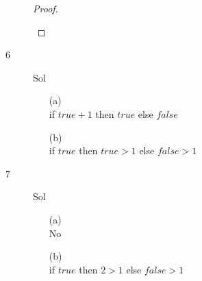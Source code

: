 \documentclass{article}
\begin{document}
\begin{description}
\begin{proof}
\begin{itemize}
            \end{itemize}
        \end{proof}
        \item[6] {Sol}\\
            \begin{enumerate}
                \item[(a)] \\
                 if $true + 1$ then $true$ else $false$
                \item[(b)] \\
                if $true$ then $true>1$ else $false>1$
            \end{enumerate}
        \item[7] {Sol} \\
                \begin{enumerate}
                     \item[(a)] \\
                     No
                     \item[(b)] \\
                     if $true$ then $2>1$ else $false>1$
                \end{enumerate}


    \end{description}
\end{document}
